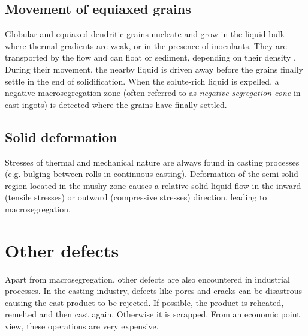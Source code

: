 \subsection{Movement of equiaxed grains}
%
Globular and equiaxed dendritic grains nucleate and grow in the liquid bulk where thermal gradients 
are weak, or in the presence of inoculants. They are transported by the flow and can float 
or sediment, depending on their density \citep{beckermann_modelling_2002}. During their movement, the nearby 
liquid is driven away before the grains finally settle in the end of solidification. When the solute-rich liquid
is expelled, a negative macrosegregation zone (often referred to as \emph{negative segregation cone} in cast ingots) 
is detected where the grains have finally settled.
%
%

\subsection{Solid deformation} 
%
Stresses of thermal and mechanical nature are always found in casting processes 
(e.g. bulging between rolls in continuous casting). 
Deformation of the semi-solid region located in the mushy zone causes a relative solid-liquid 
flow in the inward (tensile stresses) or outward (compressive stresses) direction, leading to macrosegregation.
%

\section{Other defects}
%
Apart from macrosegregation, other defects are also encountered in industrial processes. 
In the casting industry, defects like pores and cracks can be disastrous causing the cast product 
to be rejected. If possible, the product is reheated, remelted and then cast again. Otherwise it is scrapped.
From an economic point view, these operations are very expensive.

